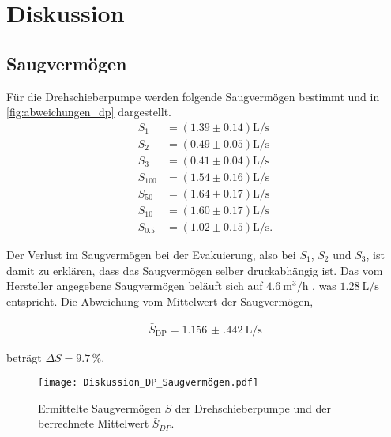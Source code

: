 \section{Diskussion}
\label{sec:Diskussion}

\subsection{Saugvermögen}

Für die Drehschieberpumpe werden folgende Saugvermögen bestimmt und in \autoref{fig:abweichungen_dp} dargestellt.
\begin{align*}
    S_1 &= (\num{1.39} \pm \num{0.14}) \si{\liter\per\second} \\
    S_2 &= (\num{0.49} \pm \num{0.05}) \si{\liter\per\second} \\
    S_3 &= (\num{0.41} \pm \num{0.04}) \si{\liter\per\second} \\
    S_{100} &= (\num{1.54} \pm \num{0.16}) \si{\liter\per\second} \\
    S_{50} &= (\num{1.64} \pm \num{0.17}) \si{\liter\per\second} \\
    S_{10} &= (\num{1.60} \pm \num{0.17}) \si{\liter\per\second} \\
    S_{\num{0.5}} &= (\num{1.02} \pm \num{0.15}) \si{\liter\per\second}.
\end{align*}

Der Verlust im Saugvermögen bei der Evakuierung, also bei $S_1$, $S_2$ und $S_3$, ist damit zu erklären, dass das Saugvermögen selber druckabhängig ist.
Das vom Hersteller angegebene Saugvermögen beläuft sich auf $\SI{4.6}{\meter\cubed\per\hour}$ \cite{delta_tu_dortmund}, was  $\SI{1.28}{\liter\per\second}$ entspricht.
Die Abweichung vom Mittelwert der Saugvermögen,

\begin{align*}
    \bar{S}_{\text{DP}} = \qty{1.156(442)}{\liter\per\second}
\end{align*}

beträgt $\Delta S = \num{9.7} \, \%$.

\begin{figure}[H]
    \centering
    \texttt{[image: Diskussion\_DP\_Saugvermögen.pdf]}
    \caption{Ermittelte Saugvermögen $S$ der Drehschieberpumpe und der berrechnete Mittelwert $\bar{S}_{DP}$.}
    \label{fig:abweichungen_dp}
\end{figure}

